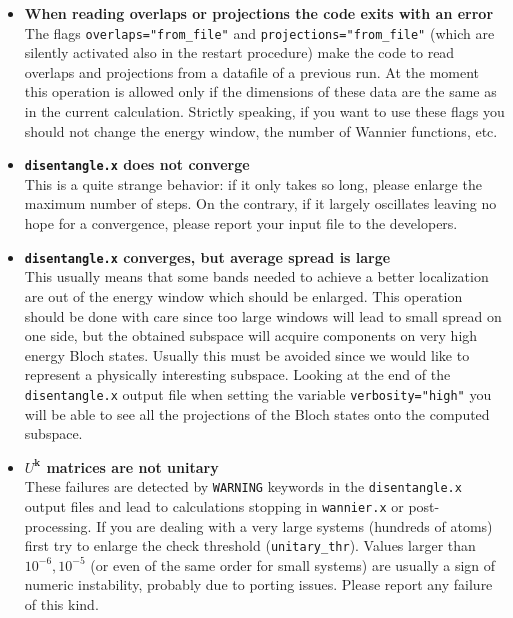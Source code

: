 \begin{itemize}
\item   {\bf When reading overlaps or projections the code exits with an error } \\
        The flags {\tt overlaps="from\_file"} and {\tt projections="from\_file"}
        (which are silently activated also in the restart procedure) make the
        code to read overlaps and projections from a datafile of a previous run.
        At the moment 
        this operation is allowed only if the dimensions of these data are the
        same as in the current calculation. Strictly speaking, if you want to use 
        these flags you should not change the energy window, 
        the number of Wannier functions, etc.

\item   {\bf {\tt disentangle.x} does not converge } \\
        This is a quite strange behavior: if it only takes so long, please enlarge
        the maximum number of steps. On the contrary, if it largely oscillates
        leaving no hope for a convergence, please report your input file to the
        developers.

\item   {\bf {\tt disentangle.x} converges, but average spread is large } \\
        This usually means that some bands needed to achieve a better localization
        are out of the energy window which should be enlarged. This operation should
        be done with care since too large windows will lead to small spread on one
        side, but the obtained subspace will acquire components on very high energy
        Bloch states. Usually this must be avoided since we would like to represent
        a physically interesting subspace.
        Looking at the end of the {\tt disentangle.x} output file when setting the
        variable {\tt verbosity="high"} you will be able to see all the projections
        of the Bloch states onto the computed subspace.

\item   {\bf $U^{\mathbf{k}}$ matrices are not unitary } \\
        These failures are detected by {\tt WARNING} keywords in the {\tt disentangle.x}
        output files and lead to calculations stopping in {\tt wannier.x} or
        post-processing. If you are dealing with a very large systems
        (hundreds of atoms) first try to enlarge the check threshold ({\tt unitary\_thr}).
        Values larger than $10^{-6}, 10^{-5}$ (or even of the same order for small systems)
        are usually a sign of numeric instability, probably due to porting issues.
        Please report any failure of this kind.


\end{itemize}
